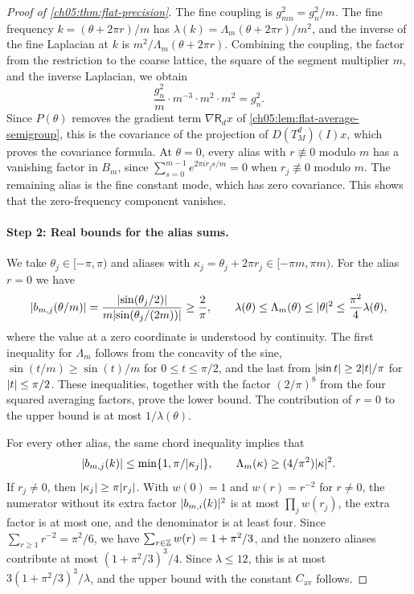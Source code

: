 \begin{proof}[Proof of \cref{ch05:thm:flat-precision}]
The fine coupling is $g_{mn}^2=g_n^2/m$. The fine frequency $k=(\theta+2\pi r)/m$ has $\lambda(k)=\Lambda_m(\theta+2\pi r)/m^2$, and the inverse of the fine Laplacian at $k$ is $m^2/\Lambda_m(\theta+2\pi r)$. Combining the coupling, the factor from the restriction to the coarse lattice, the square of the segment multiplier $m$, and the inverse Laplacian, we obtain
\[
 \frac{g_n^2}m\cdot m^{-3}\cdot m^2\cdot m^2=g_n^2.
\]
Since $P(\theta)$ removes the gradient term $\nabla\mathsf R_dx$ of \cref{ch05:lem:flat-average-semigroup}, this is the covariance of the projection of $D(T_M^d)(I)x$, which proves the covariance formula. At $\theta=0$, every alias with $r\not\equiv0$ modulo $m$ has a vanishing factor in $B_m$, since $\sum_{s=0}^{m-1}e^{2\pi ir_js/m}=0$ when $r_j\not\equiv0$ modulo $m$. The remaining alias is the fine constant mode, which has zero covariance. This shows that the zero-frequency component vanishes.

\paragraph{Step 2: Real bounds for the alias sums.}
We take $\theta_j\in[-\pi,\pi)$ and aliases with $\kappa_j=\theta_j+2\pi r_j\in[-\pi m,\pi m)$. For the alias $r=0$ we have
\[
 \lvert b_{m,j}(\theta/m)\rvert=\frac{\lvert \sin(\theta_j/2)\rvert}{m\lvert \sin(\theta_j/(2m))\rvert}\ge\frac2\pi,\qquad
 \lambda(\theta)\le\Lambda_m(\theta)\le\lvert \theta\rvert^2\le\frac{\pi^2}4\lambda(\theta),
\]
where the value at a zero coordinate is understood by continuity. The first inequality for $\Lambda_m$ follows from the concavity of the sine, $\sin(t/m)\ge\sin(t)/m$ for $0\le t\le\pi/2$, and the last from $\lvert \sin t\rvert\ge2\lvert t\rvert/\pi$ for $\lvert t\rvert\le\pi/2$. These inequalities, together with the factor $(2/\pi)^8$ from the four squared averaging factors, prove the lower bound. The contribution of $r=0$ to the upper bound is at most $1/\lambda(\theta)$.

For every other alias, the same chord inequality implies that
\[
 \lvert b_{m,j}(k)\rvert\le\min\{1,\pi/\lvert \kappa_j\rvert\},\qquad\Lambda_m(\kappa)\ge(4/\pi^2)\lvert \kappa\rvert^2.
\]
If $r_j\ne0$, then $\lvert \kappa_j\rvert\ge\pi\lvert r_j\rvert$. With $w(0)=1$ and $w(r)=r^{-2}$ for $r\ne0$, the numerator without its extra factor $\lvert b_{m,i}(k)\rvert^2$ is at most $\prod_jw(r_j)$, the extra factor is at most one, and the denominator is at least four. Since $\sum_{r\ge1}r^{-2}=\pi^2/6$, we have $\sum_{r\in\mathbb Z}w(r)=1+\pi^2/3$, and the nonzero aliases contribute at most $(1+\pi^2/3)^3/4$. Since $\lambda\le12$, this is at most $3(1+\pi^2/3)^3/\lambda$, and the upper bound with the constant $C_{\mathrm{av}}$ follows.


\end{proof}

